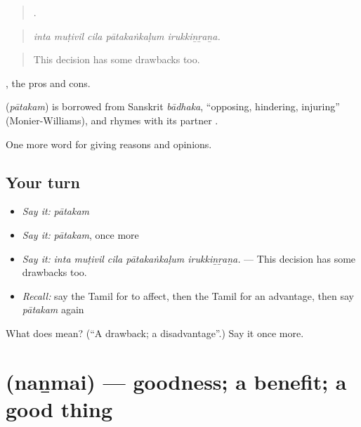 \begin{quote}
    .
\end{quote}

\begin{quote}
\emph{inta muṭivil cila pātakaṅkaḷum irukkiṉṟaṉa.}
\end{quote}

\begin{quote}
This decision has some drawbacks too.
\end{quote}

 , the pros and cons.

\begin{cousinweb}
\textbf{} (\emph{pātakam}) is borrowed from Sanskrit \emph{bādhaka}, \textquotedblleft{}opposing, hindering, injuring\textquotedblright{} (Monier-Williams), and rhymes with its partner .
\end{cousinweb}

\begin{grammarlens}[title={What you've built}]
One more word for giving reasons and opinions.
\end{grammarlens}

\subsection*{Your turn}
\begin{itemize}
\raggedright
  \item \emph{Say it:} \emph{pātakam}
  \item \emph{Say it:} \emph{pātakam}, once more
  \item \emph{Say it:} \emph{inta muṭivil cila pātakaṅkaḷum irukkiṉṟaṉa.} — This decision has some drawbacks too.
  \item \emph{Recall:} say the Tamil for to affect, then the Tamil for an advantage, then say \emph{pātakam} again
\end{itemize}

\begin{tcolorbox}[breakable,colback=teal!4,colframe=teal!35!black,title={Before you move on}]
What does  mean? (\textquotedblleft{}A drawback; a disadvantage\textquotedblright{}.) Say it once more.
\end{tcolorbox}
\section[\texorpdfstring{\ta{நன்மை} (naṉmai)}{நன்மை (naṉmai)}]{ (naṉmai) — goodness; a benefit; a good thing}


